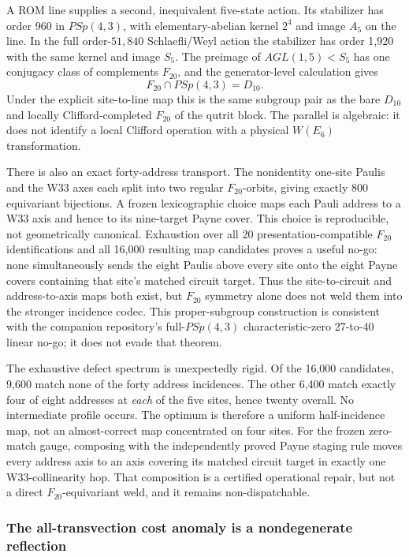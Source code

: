 \documentclass[11pt,letterpaper]{article}
\newcommand{\tagbox}[3]{\tikz[baseline=(X.base)]{\node[inner xsep=3.5pt,inner ysep=1.4pt,rounded corners=1.6pt,fill=#1,text=#2,font=\bfseries\sffamily\tiny] (X) {#3};}}
\newcommand{\PROVED}{\tagbox{greenlite}{green!45!black}{PROVED}}
\begin{document}
A ROM line supplies a second, inequivalent five-state action.  Its stabilizer
has order 960 in $PSp(4,3)$, with elementary-abelian kernel $2^4$ and image
$A_5$ on the line.  In the full order-$51{,}840$ Schlaefli/Weyl action the
stabilizer has order 1,920 with the same kernel and image $S_5$.  The preimage
of $AGL(1,5)<S_5$ has one conjugacy class of complements $F_{20}$, and the
generator-level calculation gives
\[
 F_{20}\cap PSp(4,3)=D_{10}.
\]
Under the explicit site-to-line map this is the same subgroup pair as the bare
$D_{10}$ and locally Clifford-completed $F_{20}$ of the qutrit block.  The
parallel is algebraic: it does not identify a local Clifford operation with a
physical $W(E_6)$ transformation. \PROVED

There is also an exact forty-address transport.  The nonidentity one-site
Paulis and the W33 axes each split into two regular $F_{20}$-orbits, giving
exactly 800 equivariant bijections.  A frozen lexicographic choice maps each
Pauli address to a W33 axis and hence to its nine-target Payne cover.  This
choice is reproducible, not geometrically canonical.  Exhaustion over all 20
presentation-compatible $F_{20}$ identifications and all 16,000 resulting
map candidates proves a useful no-go: none simultaneously sends the eight
Paulis above every site onto the eight Payne covers containing that site's
matched circuit target.  Thus the site-to-circuit and address-to-axis maps both
exist, but $F_{20}$ symmetry alone does not weld them into the stronger
incidence codec.  This proper-subgroup construction is consistent with the
companion repository's full-$PSp(4,3)$ characteristic-zero 27-to-40 linear
no-go; it does not evade that theorem.

The exhaustive defect spectrum is unexpectedly rigid.  Of the 16,000
candidates, 9,600 match none of the forty address incidences.  The other 6,400
match exactly four of eight addresses at \emph{each} of the five sites, hence
twenty overall.  No intermediate profile occurs.  The optimum is therefore a
uniform half-incidence map, not an almost-correct map concentrated on four
sites.  For the frozen zero-match gauge, composing with the independently
proved Payne staging rule moves every address axis to an axis covering its
matched circuit target in exactly one W33-collinearity hop.  That composition
is a certified operational repair, but not a direct $F_{20}$-equivariant weld,
and it remains non-dispatchable. \PROVED

\subsubsection{The all-transvection cost anomaly is a nondegenerate reflection}
\end{document}
